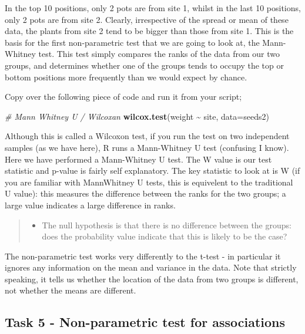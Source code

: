 \documentclass[
]{book}
\newenvironment{Shaded}{\begin{snugshade}}{\end{snugshade}}
\newcommand{\AttributeTok}[1]{\textcolor[rgb]{0.13,0.29,0.53}{#1}}
\newcommand{\CommentTok}[1]{\textcolor[rgb]{0.56,0.35,0.01}{\textit{#1}}}
\newcommand{\FunctionTok}[1]{\textcolor[rgb]{0.13,0.29,0.53}{\textbf{#1}}}
\newcommand{\NormalTok}[1]{#1}
\newcommand{\SpecialCharTok}[1]{\textcolor[rgb]{0.81,0.36,0.00}{\textbf{#1}}}
\providecommand{\tightlist}{%
  \setlength{\itemsep}{0pt}\setlength{\parskip}{0pt}}
\begin{document}
In the top 10 positions, only 2 pots are from site 1, whilst in the last 10 positions, only 2 pots are from site 2. Clearly, irrespective of the spread or mean of these data, the plants from site 2 tend to be bigger than those from site 1. This is the basis for the first non-parametric test that we are going to look at, the Mann-Whitney test. This test simply compares the ranks of the data from our two groups, and determines whether one of the groups tends to occupy the top or bottom positions more frequently than we would expect by chance.

Copy over the following piece of code and run it from your script;

\begin{Shaded}
\begin{Highlighting}[]
\CommentTok{\# Mann Whitney U / Wilcoxan }
\FunctionTok{wilcox.test}\NormalTok{(weight }\SpecialCharTok{\textasciitilde{}}\NormalTok{ site, }\AttributeTok{data=}\NormalTok{seeds2) }
\end{Highlighting}
\end{Shaded}

Although this is called a Wilcoxon test, if you run the test on two independent samples (as we have here), R runs a Mann-Whitney U test (confusing I know). Here we have performed a Mann-Whitney U test. The W value is our test statistic and p-value is fairly self explanatory. The key statistic to look at is W (if you are familiar with MannWhitney U tests, this is equivelent to the traditional U value): this measures the difference between the ranks for the two groups; a large value indicates a large difference in ranks.

\begin{quote}
\begin{itemize}
\tightlist
\item
  The null hypothesis is that there is no difference between the groups: does the probability value indicate that this is likely to be the case?
\end{itemize}
\end{quote}

The non-parametric test works very differently to the t-test - in particular it ignores any information on the mean and variance in the data. Note that strictly speaking, it tells us whether the location of the data from two groups is different, not whether the means are different.

\hypertarget{task-5---non-parametric-test-for-associations}{%
\subsection{Task 5 - Non-parametric test for associations}\label{task-5---non-parametric-test-for-associations}}
\end{document}
